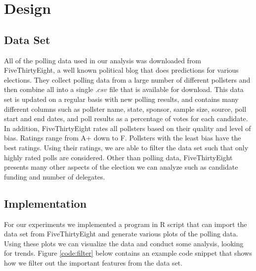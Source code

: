 \section{Design}\label{design}

\subsection{Data Set}

All of the polling data used in our analysis was downloaded from FiveThirtyEight, a well known political blog that does predictions for various elections\cite{jr._malone_skelley_koerth_paine_dubin_sawchik_rakich}. They collect polling data from a large number of different pollsters and then combine all into a single $.csv$ file that is available for download. This data set is updated on a regular basis with new polling results, and contains many different columns such as pollster name, state, sponsor, sample size, source, poll start and end dates, and poll results as a percentage of votes for each candidate. In addition, FiveThirtyEight rates all pollsters based on their quality and level of bias. Ratings range from A+ down to F. Pollsters with the least bias have the best ratings. Using their ratings, we are able to filter the data set such that only highly rated polls are considered. Other than polling data, FiveThirtyEight presents many other aspects of the election we can analyze such as candidate funding and number of delegates.

\subsection{Implementation}

For our experiments we implemented a program in R script that can import the data set from FiveThirtyEight and generate various plots of the polling data. Using these plots we can visualize the data and conduct some analysis, looking for trends. Figure \ref{code:filter} below contains an example code snippet that shows how we filter out the important features from the data set.

